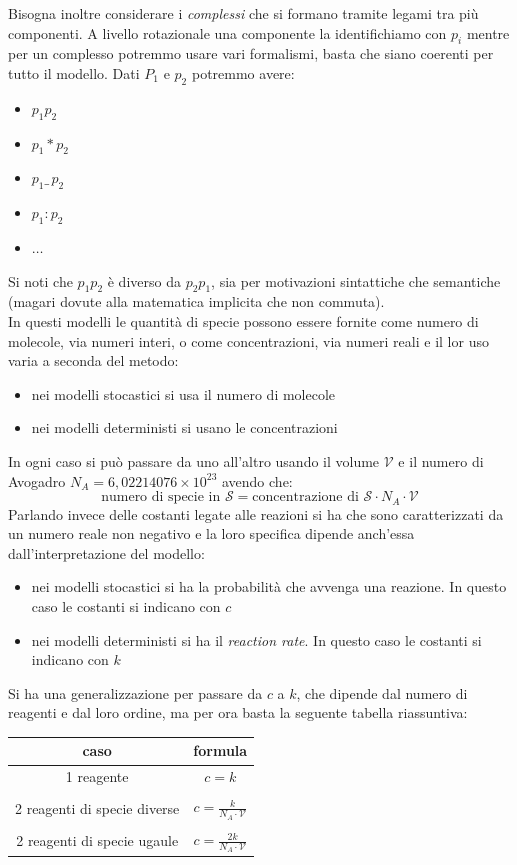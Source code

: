 \documentclass[a4paper,12pt, oneside]{book}
\begin{document}
Bisogna inoltre considerare i \textit{complessi} che si formano tramite legami
tra più componenti. A livello rotazionale una componente la identifichiamo con
$p_i$ mentre per un complesso potremmo usare vari formalismi, basta che siano
coerenti per tutto il modello. Dati $P_1$ e $p_2$ potremmo avere:
\begin{itemize}
  \item $p_1p_2$
  \item $p_1*p_2$
  \item $p_1\_\,p_2$
  \item $p_1:p_2$
  \item $\ldots$
\end{itemize}
Si noti che $p_1p_2$ è diverso da $p_2p_1$, sia per motivazioni sintattiche che
semantiche (magari dovute alla matematica implicita che non commuta).\\
In questi modelli  le quantità di specie possono essere fornite come numero di
molecole, via numeri interi, o come concentrazioni, via numeri reali e il lor
uso varia a seconda del metodo:
\begin{itemize}
  \item nei modelli stocastici si usa il numero di molecole
  \item nei modelli deterministi si usano le concentrazioni
\end{itemize}
In ogni caso si può passare da uno all'altro usando il volume $\mathcal{V}$ e il
numero di Avogadro $N_A=6,02214076\times 10^{23}$ avendo che:
\[\mbox{numero di specie in }\mathcal{S}=\mbox{concentrazione di
  }\mathcal{S}\cdot N_A\cdot \mathcal{V}\]
Parlando invece delle costanti legate alle reazioni si ha che sono
caratterizzati da un numero reale non negativo e la loro specifica dipende
anch'essa dall'interpretazione del modello:
\begin{itemize}
  \item nei modelli stocastici si ha la probabilità che avvenga una reazione. In
  questo caso le costanti si indicano con $c$
  \item nei modelli deterministi si ha il \textit{reaction rate}. In
  questo caso le costanti si indicano con $k$
\end{itemize}
Si ha una generalizzazione per passare da $c$ a $k$, che dipende dal numero di
reagenti e dal loro ordine, ma per ora basta la seguente
tabella riassuntiva:
\begin{table}[H]
  \centering
  \begin{tabular}{c|c}
    caso&formula\\
    \hline
    1 reagente & $c=k$\\
    &\\
    2 reagenti di specie diverse & $c=\frac{k}{N_A\cdot \mathcal{V}}$\\
    &\\
    2 reagenti di specie ugaule & $c=\frac{2k}{N_A\cdot \mathcal{V}}$
  \end{tabular}
\end{table}
\end{document}

